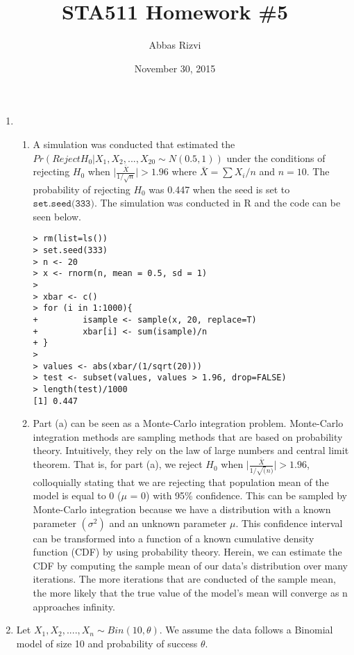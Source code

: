 \documentclass[letterpaper]{article}
\begin{document}


\title{STA511 Homework \#5}
\date{November 30, 2015}
\author{Abbas Rizvi}
\maketitle


\begin{enumerate}
\item 
\begin{enumerate}
\item A simulation was conducted that estimated the $Pr (Reject H_{0} \big| X_{1},X_{2},...,X_{20} \sim N(0.5,1))$ under the conditions of rejecting $H_{0}$ when $\big| \frac{\bar{X}}{1/\sqrt{n}}\big| > 1.96$ where $\bar{X} = \sum{X_{i}}/n$ and $n=10$. The probability of rejecting $H_{0}$ was 0.447 when the seed is set to $\texttt{set.seed(333)}$. The simulation was conducted in R and the code can be seen below.
\begin{verbatim}
> rm(list=ls())
> set.seed(333)
> n <- 20
> x <- rnorm(n, mean = 0.5, sd = 1)
> 
> xbar <- c()
> for (i in 1:1000){
+         isample <- sample(x, 20, replace=T)
+         xbar[i] <- sum(isample)/n
+ }
> 
> values <- abs(xbar/(1/sqrt(20)))
> test <- subset(values, values > 1.96, drop=FALSE)
> length(test)/1000
[1] 0.447
\end{verbatim}

\item Part (a) can be seen as a Monte-Carlo integration problem. Monte-Carlo integration methods are sampling methods that are based on probability theory. Intuitively, they rely on the law of large numbers and central limit theorem. That is, for part (a), we reject $H_{0}$ when $\vert\frac{\bar{X}}{1/\sqrt(n)}\vert > 1.96$, colloquially stating that we are rejecting that population mean of the model is equal to 0 ($\mu$ = 0) with 95\% confidence. This can be sampled by Monte-Carlo integration because we have a distribution with a known parameter $(\sigma^{2})$ and an unknown parameter $\mu$. This confidence interval can be transformed into a function of a known cumulative density function (CDF) by using probability theory. Herein, we can estimate the CDF by computing the sample mean of our data's distribution over many iterations. The more iterations that are conducted of the sample mean, the more likely that the true value of the model's mean will converge as n approaches infinity. 
\end{enumerate}

\item Let $X_{1}, X_{2}, ...., X_{n} \sim Bin(10,\theta)$. We assume the data follows a Binomial model of size 10 and probability of success $\theta$.


\end{enumerate}
\end{document}
